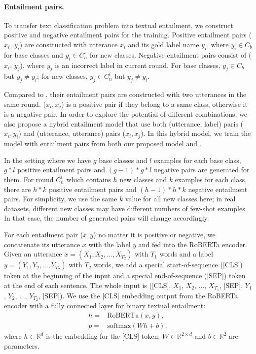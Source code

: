 \documentclass[11pt]{article}
\begin{document}
\paragraph{Entailment pairs.} 
To transfer text classification problem into textual entailment, we construct positive and negative entailment pairs for the training.
Positive entailment pairs ($x_i$, $y_i$) are constructed with utterance $x_i$ and its gold label name $y_i$, where $y_i\in C_b$ for base classes and $y_i\in C_n^i$ for new classes. Negative entailment pairs consist of ($x_i$, $y_j$), where $y_j$ is an incorrect label in current round. For base classes, $y_j\in C_b$ but $y_j\neq y_i$; for new classes, $y_j\in C_n^i$ but $y_j \neq y_i$.

Compared to \cite{zhangdiscriminative}, their entailment pairs are constructed with two utterances in the same round. ($x_i, x_j$) is a positive pair if they belong to a same class, otherwise it is a negative pair. In order to explore the potential of different combinations, we also propose a hybrid entailment model that use both (utterance, label) paris ($x_i, y_i$) and (utterance, utterance) pairs ($x_i, x_j$). In this hybrid model, we train the model with entailment pairs from both our proposed model and \citet{zhangdiscriminative}.

In the setting where we have $g$ base classes and $l$ examples for each base class, $g*l$ positive entailment pairs and $(g-1)*g*l$ negative pairs are generated for them. For round $C_n^i$ which contains $h$ new classes and $k$ examples for each class, there are $h*k$ positive entailment pairs and $(h-1)*h*k$ negative entailment pairs. For simplicity, we use the same $k$ value for all new classes here; in real datasets, different new classes may have different numbers of few-shot examples. In that case, the number of generated pairs will change accordingly.

For each entailment pair ($x, y$) no matter it is positive or negative, we concatenate its utterance $x$ with the label $y$ and fed into the RoBERTa \cite{liu2019roberta} encoder.
Given an utterance $x = (X_1, X_2, ..., X_{T_2})$ with $T_1$ words and a label $y = (Y_1, Y_2, ..., Y_{T_{2}}) $ with $T_2$ words, we add a special start-of-sequence ([CLS]) token at the beginning of the input and a special end-of-sequence ([SEP]) token at the end of each sentence. The whole input is ([CLS], $X_1$, $X_2$, ..., $X_{T_1}$, [SEP], $Y_1$, $Y_2$, ...,  $Y_{T_{2}}$, [SEP]). We use the [CLS] embedding output from the RoBERTa encoder with a fully connected layer for binary textual entailment:
\begin{align}
    h =& \text{RoBERTa}(x, y),\\
    p =& \text{softmax}(Wh + b),
\end{align}
where $h \in \mathbb{R}^{d}$ is the embedding for the [CLS] token, $W \in \mathbb{R}^{2 \times d}$ and $b \in \mathbb{R}^2$ are parameters.
\end{document}
